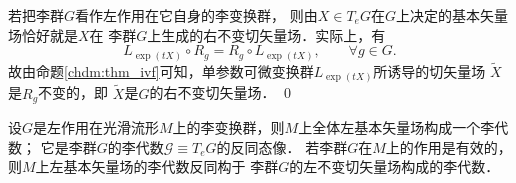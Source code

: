 \begin{example}\label{chlg:exm_ltmpa}
    若把李群$G$看作左作用在它自身的李变换群，
    则由$X \in T_e G$在$G$上决定的基本矢量场恰好就是$X$在
    李群$G$上生成的右不变切矢量场．实际上，有
    \begin{equation}
        L_{\exp (t X)} \circ R_g = R_g \circ L_{\exp (t X)},\qquad \forall g \in G.
    \end{equation}
    故由命题\ref{chdm:thm_ivf}可知，单参数可微变换群$L_{\exp(t X)}$所诱导的切矢量场
    $\widetilde{X}$是$R_{g}$不变的，即 $\widetilde{X}$是$G$的右不变切矢量场． \qed
\end{example}


\begin{theorem}\label{chlg:thm_liegaeb}
    设$G$是左作用在光滑流形$M$上的李变换群，则$M$上全体左基本矢量场构成一个李代数；
    它是李群$G$的李代数$\mathscr{G}\equiv T_e G$的{\kaishu 反}同态像．
    若李群$G$在$M$上的作用是有效的，则$M$上左基本矢量场的李代数{\kaishu 反}同构于
    李群$G$的左不变切矢量场构成的李代数．
\end{theorem}


